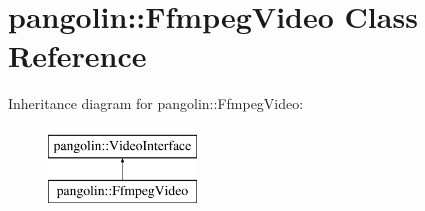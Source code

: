 \hypertarget{classpangolin_1_1_ffmpeg_video}{}\section{pangolin\+:\+:Ffmpeg\+Video Class Reference}
\label{classpangolin_1_1_ffmpeg_video}
Inheritance diagram for pangolin\+:\+:Ffmpeg\+Video\+:\begin{figure}[H]
\begin{center}
\leavevmode
\includegraphics[height=2.000000cm]{classpangolin_1_1_ffmpeg_video}
\end{center}
\end{figure}
